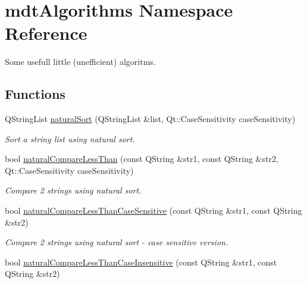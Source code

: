 \hypertarget{namespacemdt_algorithms}{
\section{mdtAlgorithms Namespace Reference}
\label{namespacemdt_algorithms}
}


Some usefull little (unefficient) algoritms.  


\subsection*{Functions}
\begin{DoxyCompactItemize}
\item 
QStringList \hyperlink{namespacemdt_algorithms_a32a09ec3855b605b6e455ea418502aeb}{naturalSort} (QStringList \&list, Qt::CaseSensitivity caseSensitivity)
\begin{DoxyCompactList}\small\item\em Sort a string list using natural sort. \end{DoxyCompactList}\item 
bool \hyperlink{namespacemdt_algorithms_af22a54e83499afe31d22fac9bc521c54}{naturalCompareLessThan} (const QString \&str1, const QString \&str2, Qt::CaseSensitivity caseSensitivity)
\begin{DoxyCompactList}\small\item\em Compare 2 strings using natural sort. \end{DoxyCompactList}\item 
\hypertarget{namespacemdt_algorithms_aa5af30feb9cfecb2971d6ae90c9c5fdf}{
bool \hyperlink{namespacemdt_algorithms_aa5af30feb9cfecb2971d6ae90c9c5fdf}{naturalCompareLessThanCaseSensitive} (const QString \&str1, const QString \&str2)}
\label{namespacemdt_algorithms_aa5af30feb9cfecb2971d6ae90c9c5fdf}

\begin{DoxyCompactList}\small\item\em Compare 2 strings using natural sort -\/ case sensitive version. \end{DoxyCompactList}\item 
\hypertarget{namespacemdt_algorithms_a3cdc3655f7adfbc5ce03fd39e8d1e986}{
bool \hyperlink{namespacemdt_algorithms_a3cdc3655f7adfbc5ce03fd39e8d1e986}{naturalCompareLessThanCaseInsensitive} (const QString \&str1, const QString \&str2)}
\label{namespacemdt_algorithms_a3cdc3655f7adfbc5ce03fd39e8d1e986}


\end{DoxyCompactItemize}
